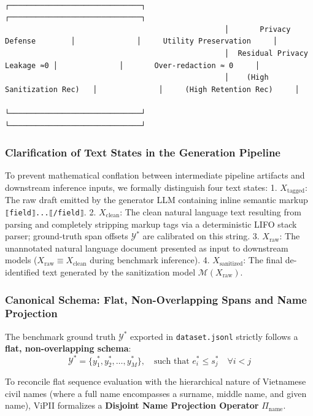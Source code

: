 \documentclass[
]{article}
\begin{document}
\begin{verbatim}
                                                  ┌──────────────────────────────┐              ┌──────────────────────────────┐
                                                  │       Privacy Defense        │              │     Utility Preservation     │
                                                  │  Residual Privacy Leakage ≈0 │              │       Over-redaction ≈ 0     │
                                                  │    (High Sanitization Rec)   │              │     (High Retention Rec)     │
                                                  └──────────────────────────────┘              └──────────────────────────────┘
\end{verbatim}

\subsubsection{Clarification of Text States in the Generation
Pipeline}\label{clarification-of-text-states-in-the-generation-pipeline}

To prevent mathematical conflation between intermediate pipeline
artifacts and downstream inference inputs, we formally distinguish four
text states: 1. \(X_{\text{tagged}}\): The raw draft emitted by the
generator LLM containing inline semantic markup
\texttt{⟦field⟧...⟦/field⟧}. 2. \(X_{\text{clean}}\): The clean natural
language text resulting from parsing and completely stripping markup
tags via a deterministic LIFO stack parser; ground-truth span offsets
\(\mathcal{Y}^*\) are calibrated on this string. 3. \(X_{\text{raw}}\):
The unannotated natural language document presented as input to
downstream models (\(X_{\text{raw}} \equiv X_{\text{clean}}\) during
benchmark inference). 4. \(X_{\text{sanitized}}\): The final
de-identified text generated by the sanitization model
\(\mathcal{M}(X_{\text{raw}})\).

\subsubsection{Canonical Schema: Flat, Non-Overlapping Spans and Name
Projection}\label{canonical-schema-flat-non-overlapping-spans-and-name-projection}

The benchmark ground truth \(\mathcal{Y}^*\) exported in
\texttt{dataset.jsonl} strictly follows a \textbf{flat, non-overlapping
schema}:
\[\mathcal{Y}^* = \{y_1^*, y_2^*, \dots, y_M^*\}, \quad \text{such that } e_i^* \le s_j^* \quad \forall i < j\]

To reconcile flat sequence evaluation with the hierarchical nature of
Vietnamese civil names (where a full name encompasses a surname, middle
name, and given name), ViPII formalizes a \textbf{Disjoint Name
Projection Operator} \(\Pi_{\text{name}}\).
\end{document}
